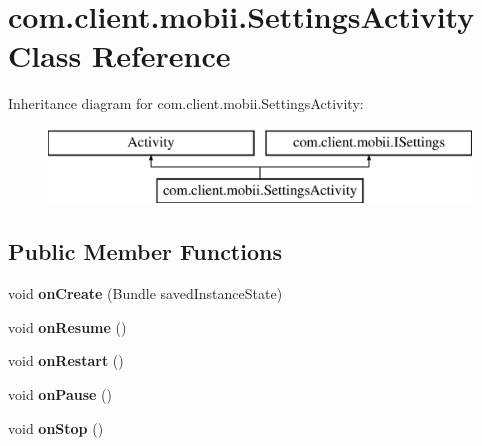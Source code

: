 \hypertarget{classcom_1_1client_1_1mobii_1_1_settings_activity}{\section{com.\-client.\-mobii.\-Settings\-Activity Class Reference}
\label{classcom_1_1client_1_1mobii_1_1_settings_activity}
}
Inheritance diagram for com.\-client.\-mobii.\-Settings\-Activity\-:\begin{figure}[H]
\begin{center}
\leavevmode
\includegraphics[height=2.000000cm]{classcom_1_1client_1_1mobii_1_1_settings_activity}
\end{center}
\end{figure}
\subsection*{Public Member Functions}
\begin{DoxyCompactItemize}
\item 
\hypertarget{classcom_1_1client_1_1mobii_1_1_settings_activity_ab5d25d5b49e133d5ab89b120ae00fd1a}{void {\bfseries on\-Create} (Bundle saved\-Instance\-State)}\label{classcom_1_1client_1_1mobii_1_1_settings_activity_ab5d25d5b49e133d5ab89b120ae00fd1a}

\item 
\hypertarget{classcom_1_1client_1_1mobii_1_1_settings_activity_a4c678c171e5cbdc1e230899c08ae3c87}{void {\bfseries on\-Resume} ()}\label{classcom_1_1client_1_1mobii_1_1_settings_activity_a4c678c171e5cbdc1e230899c08ae3c87}

\item 
\hypertarget{classcom_1_1client_1_1mobii_1_1_settings_activity_ace419af65a39e940f70dc8f9974d55ef}{void {\bfseries on\-Restart} ()}\label{classcom_1_1client_1_1mobii_1_1_settings_activity_ace419af65a39e940f70dc8f9974d55ef}

\item 
\hypertarget{classcom_1_1client_1_1mobii_1_1_settings_activity_a9570598f45c1fb73d64f6daba172afae}{void {\bfseries on\-Pause} ()}\label{classcom_1_1client_1_1mobii_1_1_settings_activity_a9570598f45c1fb73d64f6daba172afae}

\item 
\hypertarget{classcom_1_1client_1_1mobii_1_1_settings_activity_a8e4fecf1c882e03a40e3cad1d65bc80b}{void {\bfseries on\-Stop} ()}\label{classcom_1_1client_1_1mobii_1_1_settings_activity_a8e4fecf1c882e03a40e3cad1d65bc80b}

\end{DoxyCompactItemize}
